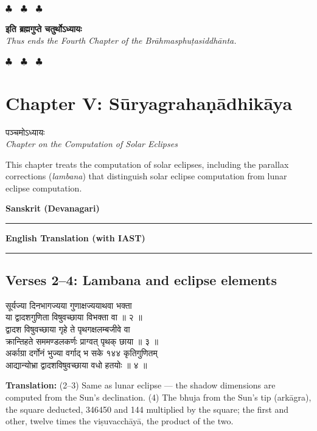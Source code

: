 \documentclass[11pt,a4paper]{article}
\newcommand{\dev}[1]{{\devanagarifont #1}}
\newcommand{\sanskritcol}[1]{%
  \begin{minipage}[t]{0.47\textwidth}
  \vspace{0pt}
  \begin{flushleft}
  #1
  \end{flushleft}
  \end{minipage}%
  \hfill
}
\newcommand{\englishcol}[1]{%
  \begin{minipage}[t]{0.47\textwidth}
  \vspace{0pt}
  \begin{flushleft}
  #1
  \end{flushleft}
  \end{minipage}%
}
\newcommand{\columnheaders}{%
  \noindent
  \begin{minipage}[t]{0.47\textwidth}
  \centering
  \textbf{\large Sanskrit (Devanagari)}\\[0.1cm]
  \rule{0.8\textwidth}{0.5pt}
  \end{minipage}%
  \hfill
  \begin{minipage}[t]{0.47\textwidth}
  \centering
  \textbf{\large English Translation (with IAST)}\\[0.1cm]
  \rule{0.8\textwidth}{0.5pt}
  \end{minipage}%
  \vspace{0.3cm}
  \par
}
\newcommand{\chapterend}{%
  \begin{center}%
  \textcolor{endmarkcolor}{$\clubsuit$~~$\clubsuit$~~$\clubsuit$}%
  \end{center}%
}
\begin{document}
\vspace{0.5cm}
\chapterend
\begin{center}
\dev{\textbf{इति ब्रह्मगुप्ते चतुर्थोऽध्यायः}}\\[0.2cm]
\textit{Thus ends the Fourth Chapter of the Brāhmasphuṭasiddhānta.}
\end{center}
\chapterend

\newpage

\section*{Chapter V: Sūryagrahaṇādhikāya}

\begin{center}
\dev{पञ्चमोऽध्यायः}\\[0.2cm]
\textit{Chapter on the Computation of Solar Eclipses}
\end{center}

This chapter treats the computation of solar eclipses, including the parallax
corrections (\textit{lambana}) that distinguish solar eclipse computation from lunar
eclipse computation.

\vspace{0.3cm}
\columnheaders

\subsection*{Verses 2--4: Lambana and eclipse elements}

\noindent
\sanskritcol{\dev{सूर्यज्या दिनभागज्यया गुणाक्षज्ययाथवा भक्ता} \\ \dev{या द्वादशगुणिता विषुवच्छाया विभक्ता वा ॥ २ ॥} \\[0.2cm]
\dev{द्वादश विषुवच्छाया गृहे ते पृथगक्षलम्बजीवे वा} \\ \dev{क्रान्तिहते सममण्डलकर्णः प्राग्वत् पृथक् छाया ॥ ३ ॥} \\[0.2cm]
\dev{अर्काग्रा दर्गोनं भुज्या वर्गाद् भ\-346450 सके १४४ कृतिगुणितम्} \\ \dev{आद्यान्योभ्रा द्वादशविषुवच्छाया वधो हतयोः ॥ ४ ॥}}
\englishcol{\textbf{Translation:} (2--3) Same as lunar eclipse --- the shadow dimensions are computed
from the Sun's declination. (4) The bhuja from the Sun's tip (arkāgra), the square
deducted, 346450 and 144 multiplied by the square; the first and other, twelve times
the viṣuvacchāyā, the product of the two.}
\end{document}
